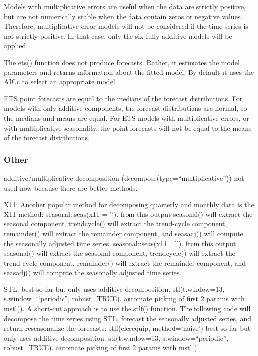 \documentclass[]{book}
\begin{document}
Models with multiplicative errors are useful when the data are strictly positive, but are not numerically stable when the data contain zeros or negative values. Therefore, multiplicative error models will not be considered if the time series is not strictly positive. In that case, only the six fully additive models will be applied.

The ets() function does not produce forecasts. Rather, it estimates the model parameters and returns information about the fitted model. By default it uses the AICc to select an appropriate model

ETS point forecasts are equal to the medians of the forecast distributions. For models with only additive components, the forecast distributions are normal, so the medians and means are equal. For ETS models with multiplicative errors, or with multiplicative seasonality, the point forecasts will not be equal to the means of the forecast distributions.

\hypertarget{other-1}{%
\subsubsection{Other}\label{other-1}}

additive/multiplicative decomposition (decompose(type=``multiplicative'')) not used now because there are better methods.

X11: Another popular method for decomposing quarterly and monthly data is the X11 method: seasonal::seas(x11 = '`). from this output seasonal() will extract the seasonal component, trendcycle() will extract the trend-cycle component, remainder() will extract the remainder component, and seasadj() will compute the seasonally adjusted time series. seasonal::seas(x11 =''). from this output seasonal() will extract the seasonal component, trendcycle() will extract the trend-cycle component, remainder() will extract the remainder component, and seasadj() will compute the seasonally adjusted time series.

STL: best so far but only uses additive decomposition. stl(t.window=13, s.window=``periodic'', robust=TRUE). automate picking of first 2 params with mstl(). A short-cut approach is to use the stlf() function. The following code will decompose the time series using STL, forecast the seasonally adjusted series, and return reseasonalize the forecasts: stlf(elecequip, method=`naive') best so far but only uses additive decomposition. stl(t.window=13, s.window=``periodic'', robust=TRUE). automate picking of first 2 params with mstl()
\end{document}
